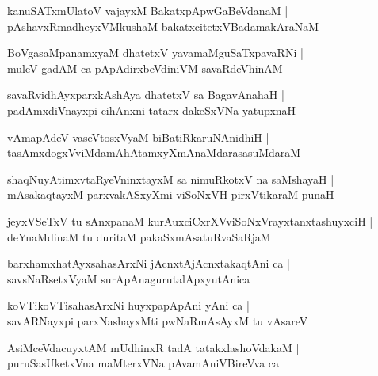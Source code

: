 \documentclass[twoside,12pt,openright]{book}
\newcounter{shloka}[chapter]
\begin{document}
\begin{shloka}%
kanuSATxmUlatoV vajayxM BakatxpApwGaBeVdanaM |\\
pAshavxRmadheyxVMkushaM bakatxcitetxVBadamakAraNaM 
\end{shloka}

\begin{shloka}%
BoVgasaMpanamxyaM dhatetxV yavamaMguSaTxpavaRNi |\\
muleV gadAM ca pApAdirxbeVdiniVM savaRdeVhinAM 
\end{shloka}

\begin{shloka}%
savaRvidhAyxparxkAshAya dhatetxV sa BagavAnahaH |\\
padAmxdiVnayxpi cihAnxni tatarx dakeSxVNa yatupxnaH 
\end{shloka}

\begin{shloka}%
vAmapAdeV vaseVtosxVyaM biBatiRkaruNAnidhiH |\\
tasAmxdogxVviMdamAhAtamxyXmAnaMdarasasuMdaraM 
\end{shloka}

\begin{shloka}%
shaqNuyAtimxvtaRyeVninxtayxM sa nimuRkotxV na saMshayaH |\\
mAsakaqtayxM parxvakASxyXmi viSoNxVH pirxVtikaraM punaH 
\end{shloka}

\begin{shloka}%
jeyxVSeTxV tu sAnxpanaM kurAuxciCxrXVviSoNxVrayxtanxtashuyxciH |\\
deYnaMdinaM tu duritaM pakaSxmAsatuRvaSaRjaM
\end{shloka}

\begin{shloka}%
barxhamxhatAyxsahasArxNi jAcnxtAjAcnxtakaqtAni ca |\\
savsNaRsetxVyaM surApAnagurutalApxyutAnica
\end{shloka}

\begin{shloka}%
koVTikoVTisahasArxNi huyxpapApAni yAni ca |\\
savARNayxpi parxNashayxMti pwNaRmAsAyxM tu vAsareV
\end{shloka}

\begin{shloka}%
AsiMceVdacuyxtAM mUdhinxR tadA tatakxlashoVdakaM |\\
puruSasUketxVna maMterxVNa pAvamAniVBireVva ca 
\end{shloka}
\end{document}
